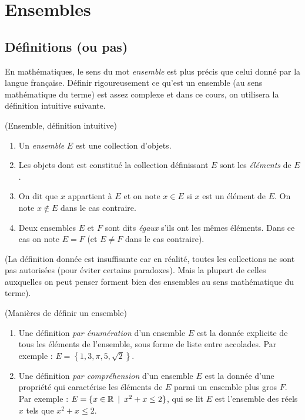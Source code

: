 \chapter{Ensembles}
\minitoc
\hyperlink{toc}{\retourTOC}

\section{Définitions (ou pas)}

En mathématiques, le sens du mot \emph{ensemble} est plus précis que celui donné par la langue française. Définir rigoureusement ce qu'est un ensemble (au sens mathématique du terme) est assez complexe et dans ce cours, on utilisera la définition intuitive suivante.

\begin{definition}(Ensemble, définition intuitive)

\begin{enumerate}
\item Un \emph{ensemble} $E$ est une collection d'objets.
\item Les objets dont est constitué la collection définissant $E$  sont les \emph{éléments} de $E$.
\item On dit que $x$ appartient à $E$ et on note $x\in E$ si $x$ est un élément de $E$. On note $x\not\in E$ dans le cas contraire.
\item Deux ensembles $E$ et $F$ sont dits \emph{égaux} s'ils ont les mêmes éléments. Dans ce cas on note $E=F$ (et $E\neq F$ dans le cas contraire).
\end{enumerate}
\end{definition}

(La définition donnée est insuffisante car en réalité, toutes les collections ne sont pas autorisées (pour éviter certains paradoxes). Mais la plupart de celles auxquelles on peut penser forment bien des ensembles au sens mathématique du terme). 

\begin{definition}(Manières de définir un ensemble)

\begin{enumerate}
\item Une définition \emph{par énumération} d'un ensemble $E$ est la donnée explicite de tous les éléments de l'ensemble, sous forme de liste entre accolades. Par exemple : $E = \left\{1,3,\pi,5,\sqrt2\right\}$.
\item Une définition \emph{par compréhension} d'un ensemble $E$ est la donnée d'une propriété qui caractérise les éléments de $E$ parmi un ensemble plus gros $F$. Par exemple : $E = \{x\in \mathbb{R}\:\mid\: x^2+x\leq 2\}$, qui se lit \og$E$ est l'ensemble des réels $x$ tels que $x^2+x\leq 2$\fg.
\end{enumerate}
\end{definition}

